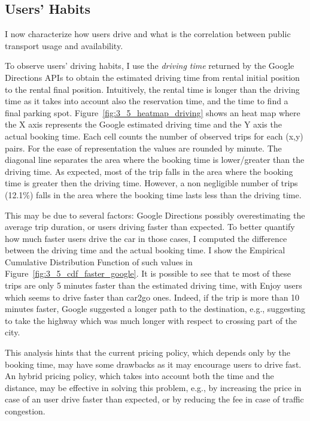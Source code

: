 \subsection{Users' Habits}

I now characterize how users drive and what is the correlation between public transport usage and availability.

To observe users' driving habits, I use the \textit{driving time} returned by the Google Directions APIs to {obtain} the estimated {driving} time from {rental initial position to the rental final position}. Intuitively, the {rental} time is longer than the driving time as it takes into account also the {reservation} time, and the time to find a final parking spot. Figure~\ref{fig:3_5_heatmap_driving} shows an heat map where the X axis represents the Google estimated driving time and the Y axis the actual booking time. Each cell counts the number of {observed} trips {for each (x,y) pairs}.
For the ease of representation the values are rounded by minute. The diagonal line separates the area where the booking time is lower/greater than the driving time. As expected, most of the trip falls in the area where the booking time is greater then the driving time. However, a non negligible number of trips (12.1\%) falls in the area where the booking time lasts less than the driving time. 



This may be due to several factors: Google Directions possibly overestimating the average trip duration, or users driving faster than expected.
To better quantify how much faster users drive the car in those cases, I  computed the difference between the driving time and the actual booking time. I show the Empirical Cumulative Distribution Function of such values in Figure~\ref{fig:3_5_cdf_faster_google}. It is possible to see that te most of these trips are only 5 minutes faster than the estimated driving time, with Enjoy users which seems to drive faster than car2go ones. Indeed, if the trip is more than 10 minutes faster, Google suggested a longer path to the destination, e.g., suggesting to take the highway which was much longer with respect to crossing part of the city.

This analysis hints that the current pricing policy, which depends only by the booking time, may have some drawbacks as it may encourage users to drive fast. An hybrid pricing policy, which takes into account both the time and the distance, may be effective in solving this problem, e.g., by increasing the price in case of an user drive faster than expected, or by reducing the fee in case of traffic congestion.

